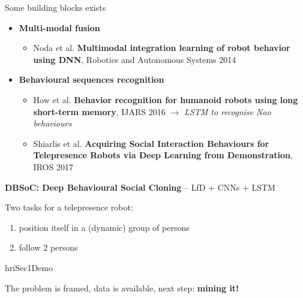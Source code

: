 \documentclass[compress]{beamer}
\begin{document}
\begin{frame}{Some building blocks exists}

    \begin{itemize}
        \item \textbf{Multi-modal fusion}

            \begin{itemize}
                \item \eg Noda et al. {\bf Multimodal integration learning of robot behavior
    using DNN}, Robotics and Autonomous Systems 2014
            \end{itemize}

        \item \textbf{Behavioural sequences recognition}
            \begin{itemize}
                \item How et al. {\bf Behavior recognition for humanoid
                    robots using long short-term memory},
                    IJARS 2016 \emph{$\rightarrow$ LSTM to recognise Nao
                    behaviours}
                \item Shiarlis et al. {\bf Acquiring Social Interaction
                    Behaviours for Telepresence Robots via Deep Learning from
                    Demonstration}, IROS 2017
            \end{itemize}
    \end{itemize}

    \pause
    {\bf DBSoC: Deep Behavioural Social Cloning} -- LfD + CNNs + LSTM

    Two tasks for a telepresence robot:
    \begin{enumerate}
        \item position itself in a (dynamic) group of persons
        \item follow 2 persons
    \end{enumerate}
\end{frame}


{
\begin{frame}[plain]

    \vspace{7cm}

\begin{beamercolorbox}[wd=\linewidth,ht=6ex,dp=0.7ex]{hriSec1Demo}

    The problem is framed, data is available, next step: {\bf mining it!}
\end{beamercolorbox}
\end{frame}
}
\end{document}
